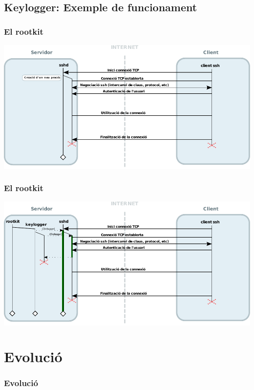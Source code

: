\documentclass{beamer}
\begin{document}
\subsection*{Keylogger: Exemple de funcionament}
\begin{frame}
	\frametitle{El rootkit}
	\includegraphics[scale=0.65,keepaspectratio]{sshd.pdf}
\end{frame}

\begin{frame}
	\frametitle{El rootkit}
	\includegraphics[scale=0.65,keepaspectratio]{sshd_keylogger.pdf}
\end{frame}

\section{Evolució}
\begin{frame}
	\frametitle{Evolució}
\end{frame}
\end{document}
